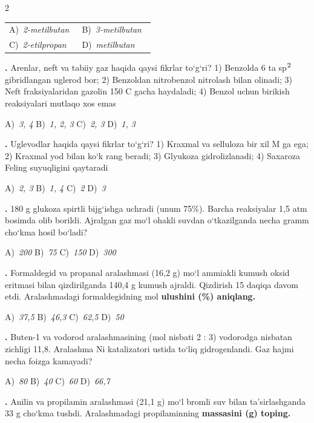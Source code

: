 \documentclass[11pt,a4paper]{article}
\renewcommand{\textsuperscript}[1]{\ensuremath{^{\text{\fontsize{8}{8}\selectfont #1}}}}
\newcommand{\qn}[1]{\textbf{\fontsize{11.5}{13}\selectfont #1}}
\newcommand{\qsep}{\par\vspace{13pt}}
\begin{document}
\begin{multicols}{2}
\noindent\begin{tabular}{@{}p{0.47\linewidth}@{}p{0.47\linewidth}@{}}
A)~\textsl{2-metilbutan} & B)~\textsl{3-metilbutan} \\
C)~\textsl{2-etilpropan} & D)~\textsl{metilbutan} \\
\end{tabular}\par
\qsep
\noindent\qn{21.} Arenlar, neft va tabiiy gaz haqida qaysi fikrlar to`g`ri? 1) Benzolda 6 ta sp\textsuperscript{2} gibridlangan uglerod bor; 2) Benzoldan nitrobenzol nitrolash bilan olinadi; 3) Neft fraksiyalaridan gazolin 150 \textdegree{}C gacha haydaladi; 4) Benzol uchun birikish reaksiyalari mutlaqo xos emas

\noindent A)~\textsl{3, 4} \hfill B)~\textsl{1, 2, 3} \hfill C)~\textsl{2, 3} \hfill D)~\textsl{1, 3}\par
\qsep
\noindent\qn{22.} Uglevodlar haqida qaysi fikrlar to`g`ri? 1) Kraxmal va selluloza bir xil M ga ega; 2) Kraxmal yod bilan ko`k rang beradi; 3) Glyukoza gidrolizlanadi; 4) Saxaroza Feling suyuqligini qaytaradi

\noindent A)~\textsl{2, 3} \hfill B)~\textsl{1, 4} \hfill C)~\textsl{2} \hfill D)~\textsl{3}\par
\qsep
\noindent\qn{23.} 180 g glukoza spirtli bijg`ishga uchradi (unum 75\%). Barcha reaksiyalar 1,5 atm bosimda olib borildi. Ajralgan gaz mo`l ohakli suvdan o`tkazilganda necha gramm cho`kma hosil bo`ladi?

\noindent A)~\textsl{200} \hfill B)~\textsl{75} \hfill C)~\textsl{150} \hfill D)~\textsl{300}\par
\qsep
\noindent\qn{24.} Formaldegid va propanal aralashmasi (16,2 g) mo`l ammiakli kumush oksid eritmasi bilan qizdirilganda 140,4 g kumush ajraldi. Qizdirish 15 daqiqa davom etdi. Aralashmadagi formaldegidning mol \textbf{ulushini (\%) aniqlang.}

\noindent A)~\textsl{37,5} \hfill B)~\textsl{46,3} \hfill C)~\textsl{62,5} \hfill D)~\textsl{50}\par
\qsep
\noindent\qn{25.} Buten-1 va vodorod aralashmasining (mol nisbati 2 : 3) vodorodga nisbatan zichligi 11,8. Aralashma Ni katalizatori ustida to`liq gidrogenlandi. Gaz hajmi necha foizga kamayadi?

\noindent A)~\textsl{80} \hfill B)~\textsl{40} \hfill C)~\textsl{60} \hfill D)~\textsl{66,7}\par
\qsep
\noindent\qn{26.} Anilin va propilamin aralashmasi (21,1 g) mo`l bromli suv bilan ta'sirlashganda 33 g cho`kma tushdi. Aralashmadagi propilaminning \textbf{massasini (g) toping.}


\end{multicols}
\end{document}
